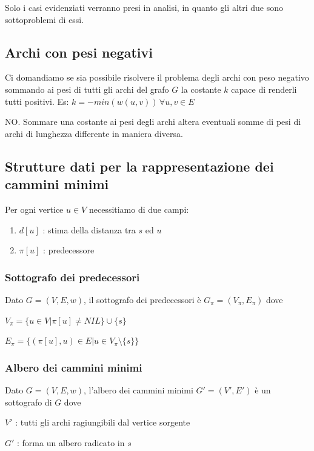 \documentclass[tikz]{article}
\providecommand{\tightlist}{%
  \setlength{\itemsep}{0pt}\setlength{\parskip}{0pt}}
\begin{document}
{{{Solo i casi evidenziati verranno presi in analisi, in quanto gli altri due sono sottoproblemi di essi.}

\subsection{Archi con pesi negativi}

{Ci domandiamo se sia possibile risolvere il problema degli archi con peso negativo sommando ai pesi di tutti gli archi del grafo $G$ la costante $k$ capace di renderli tutti positivi. Es: $k=-min(w(u,v))\,\forall u,v \in E$}

{NO. Sommare una costante ai pesi degli archi altera eventuali somme di pesi di archi di lunghezza differente in maniera diversa.}

\subsection{Strutture dati per la rappresentazione dei cammini minimi}

{Per ogni vertice $u \in V$ necessitiamo di due campi:}

\begin{enumerate}
\tightlist
\item
$d[u]$ : stima della distanza tra $s$ ed $u$
\item
$\pi[u]$ : predecessore
\end{enumerate}

\subsubsection{Sottografo dei predecessori}

{Dato $G=(V,E,w)$, il sottografo dei predecessori è $G_\pi=(V_\pi,E_\pi)$ dove}

$V_\pi=\{u \in V | \pi[u] \neq NIL\} \cup \{s\}$

$E_\pi=\{(\pi[u],u) \in E | u \in V_{\pi} \setminus \{s\}\}$

\subsubsection{Albero dei cammini minimi}

{Dato $G=(V,E,w)$, l'albero dei cammini minimi $G'=(V',E')$ è un sottografo di $G$ dove}

{$V'$ : tutti gli archi ragiungibili dal vertice sorgente}

{$G'$ : forma un albero radicato in $s$}

}}
\end{document}
